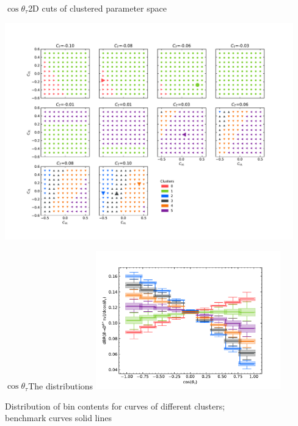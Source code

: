 \begin{frame}{$\cos\theta_\tau$}{2D cuts of clustered parameter space}
	\begin{changemargin}{-1cm}{-1cm}
		\centering
		\includegraphics[width=12.5cm,clip,trim=0cm 0cm 0cm 2cm]{figures/from-paper/cosl_clust2D.pdf}
	\end{changemargin}
\end{frame}
%
\begin{frame}{$\cos\theta_\tau$}{The distributions}
	\centering
	\includegraphics[width=8cm, clip, trim=1cm 0.75cm 1cm 1cm]{figures/from-paper/cosl_box.pdf}
	
	Distribution of bin contents for curves of different clusters;\\
	benchmark curves solid lines 
	
\end{frame}
%
